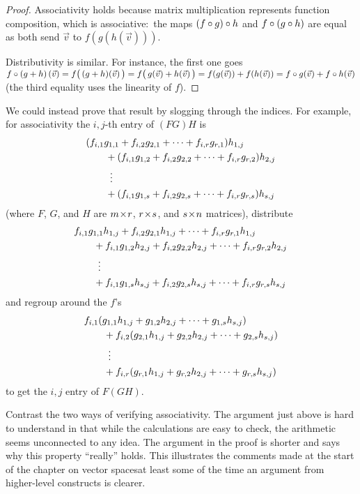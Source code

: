 \begin{proof}
Associativity holds because matrix multiplication represents function
composition, which is associative:~the maps
\( (f\mathbin\circ g)\mathbin\circ h \) and 
\( f\mathbin\circ (g\mathbin\circ h) \) are equal 
as both send \( \vec{v} \) to \( f(g(h(\vec{v}))) \).

Distributivity  is similar.
For instance, the first one goes
\( f\mathbin\circ (g+h)\,(\vec{v})
    =f\bigl(\,(g+h)(\vec{v})\,\bigr)  
    =f\bigl(\,g(\vec{v})+h(\vec{v})\,\bigr)
    =f(g(\vec{v}))+f(h(\vec{v}))
    =f\mathbin\circ g(\vec{v})+f\mathbin\circ h(\vec{v}) \) 
(the third equality uses the linearity of $f$).
\end{proof}

\begin{remark} 
We could instead prove that result by slogging through the indices.
For example, for associativity
the \( i,j \)-th entry of \( (FG)H \) is
\begin{align*}
   \MoveEqLeft (f_{i,1}g_{1,1}+f_{i,2}g_{2,1}+\dots+f_{i,r}g_{r,1})h_{1,j}         \\
   &+(f_{i,1}g_{1,2}+f_{i,2}g_{2,2}+\dots+f_{i,r}g_{r,2})h_{2,j}   \\
   &\vdotswithin{+}                                       \\
   &+(f_{i,1}g_{1,s}+f_{i,2}g_{2,s}+\dots+f_{i,r}g_{r,s})h_{s,j}
\end{align*}
(where \( F \), \( G \), and \( H \) are \( m \! \times \! r \),
\( r \! \times \! s \), and \( s \! \times \! n \) matrices),
distribute
\begin{align*}
   \MoveEqLeft f_{i,1}g_{1,1}h_{1,j}+f_{i,2}g_{2,1}h_{1,j}+
            \dots+f_{i,r}g_{r,1}h_{1,j}                  \\ 
   &+f_{i,1}g_{1,2}h_{2,j}+f_{i,2}g_{2,2}h_{2,j}+
          \dots+f_{i,r}g_{r,2}h_{2,j}                      \\
   &\vdotswithin{+}                                           \\
   &+f_{i,1}g_{1,s}h_{s,j}+f_{i,2}g_{2,s}h_{s,j}+\dots
        +f_{i,r}g_{r,s}h_{s,j}
\end{align*}
and regroup around the \( f \)'s
\begin{align*}
   \MoveEqLeft f_{i,1}(g_{1,1}h_{1,j}+g_{1,2}h_{2,j}+\dots+g_{1,s}h_{s,j})     \\
   &+f_{i,2}(g_{2,1}h_{1,j}+g_{2,2}h_{2,j}+\dots+g_{2,s}h_{s,j})   \\
   &\vdotswithin{+}                                       \\
   &+f_{i,r}(g_{r,1}h_{1,j}+g_{r,2}h_{2,j}+\dots+g_{r,s}h_{s,j})
\end{align*}
to get the \( i,j \) entry of \( F(GH) \).

Contrast the two ways of verifying associativity.
The argument just above is hard to understand in that while
the calculations are easy to check, the arithmetic seems unconnected to any
idea.
The argument in the proof 
is shorter and says why this property ``really'' holds.
This illustrates the comments made at the start of
the chapter on vector spaces\Dash at least some 
of the time an argument from higher-level constructs is clearer.
\end{remark}

